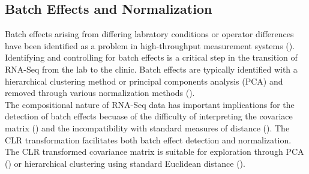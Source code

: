 \documentclass{article}\usepackage[]{graphicx}\usepackage[]{color}
\begin{document}
\subsection{Batch Effects and Normalization}
Batch effects arising from differing labratory conditions or operator differences have been identified as a problem in high-throughput measurement systems (\cite{leek2010, chen2011}).  Identifying and controlling for batch effects is a critical step in the transition of RNA-Seq from the lab to the clinic.  Batch effects are typically identified with a hierarchical clustering method or principal components analysis (PCA) and removed through various normalization methods (\cite{Robinson2007, Anders2010, Robinson2010, Law2014, leek2014}).  \\ 

The compositional nature of RNA-Seq data has important implications for the detection of batch effects becuase of the difficulty of interpreting the covariace matrix (\cite{Aitchison1986}) and the incompatibility with standard measures of distance (\cite{Martin-Fernandez1998}).  The CLR transformation facilitates both batch effect detection and normalization.  The CLR transformed covariance matrix is suitable for exploration through PCA (\cite{Aitchison2002}) or hierarchical clustering using standard Euclidean distance (\cite{Martin-Fernandez1998}).  \\


% 
% 
\newpage

\printbibliography
\end{document}
